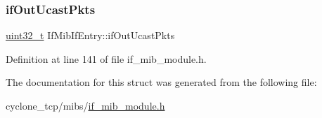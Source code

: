 \mbox{\label{structIfMibIfEntry_aacaaf6c959c48cd89cb423930b2fe300}} 
\subsubsection{\texorpdfstring{if\+Out\+Ucast\+Pkts}{ifOutUcastPkts}}
{\footnotesize\ttfamily \hyperlink{stdint_8h_a435d1572bf3f880d55459d9805097f62}{uint32\+\_\+t} If\+Mib\+If\+Entry\+::if\+Out\+Ucast\+Pkts}



Definition at line 141 of file if\+\_\+mib\+\_\+module.\+h.



The documentation for this struct was generated from the following file\+:\begin{DoxyCompactItemize}
\item 
cyclone\+\_\+tcp/mibs/\hyperlink{if__mib__module_8h}{if\+\_\+mib\+\_\+module.\+h}\end{DoxyCompactItemize}
